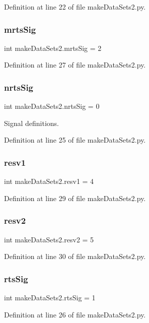 Definition at line 22 of file make\+Data\+Sets2.\+py.

\mbox{\label{namespacemake_data_sets2_ac746c03ad422f6301153a9cb2078f996}} 
\subsubsection{mrts\+Sig}
{\footnotesize\ttfamily int make\+Data\+Sets2.\+mrts\+Sig = 2}



Definition at line 27 of file make\+Data\+Sets2.\+py.

\mbox{\label{namespacemake_data_sets2_afbaa9f9c47f4713c29e3f2c12b103e79}} 
\subsubsection{nrts\+Sig}
{\footnotesize\ttfamily int make\+Data\+Sets2.\+nrts\+Sig = 0}



Signal definitions. 



Definition at line 25 of file make\+Data\+Sets2.\+py.

\mbox{\label{namespacemake_data_sets2_af71bcb0aaf38475da192f352dffb1149}} 
\subsubsection{resv1}
{\footnotesize\ttfamily int make\+Data\+Sets2.\+resv1 = 4}



Definition at line 29 of file make\+Data\+Sets2.\+py.

\mbox{\label{namespacemake_data_sets2_a1ffd7c16ae7af37571b2be97e01f46c7}} 
\subsubsection{resv2}
{\footnotesize\ttfamily int make\+Data\+Sets2.\+resv2 = 5}



Definition at line 30 of file make\+Data\+Sets2.\+py.

\mbox{\label{namespacemake_data_sets2_ad92ec58b1bd30587368c36d269a1ee79}} 
\subsubsection{rts\+Sig}
{\footnotesize\ttfamily int make\+Data\+Sets2.\+rts\+Sig = 1}



Definition at line 26 of file make\+Data\+Sets2.\+py.


